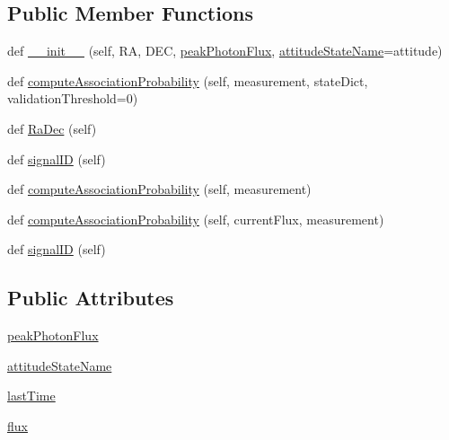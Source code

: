 \subsection*{Public Member Functions}
\begin{DoxyCompactItemize}
\item 
def \hyperlink{classSignals_1_1StaticXRayPointSource_ae3efcdb0e8a8c7fe9e3984c1cb785196}{\+\_\+\+\_\+init\+\_\+\+\_\+} (self, RA, D\+EC, \hyperlink{classSignals_1_1StaticXRayPointSource_a7e16da6506ee1b83c9858dce9c7856ea}{peak\+Photon\+Flux}, \hyperlink{classSignals_1_1PointSource_a151f2600c3623d1ca49fb51feb8a1178}{attitude\+State\+Name}=\textquotesingle{}attitude\textquotesingle{})
\item 
def \hyperlink{classSignals_1_1StaticXRayPointSource_a0533a3647597c6ad91c238ab2b97a829}{compute\+Association\+Probability} (self, measurement, state\+Dict, validation\+Threshold=0)
\item 
def \hyperlink{classSignals_1_1PointSource_a5fbb36eda0901536d77eff9a3262ae9e}{Ra\+Dec} (self)
\item 
def \hyperlink{classSignals_1_1SignalSource_a85016cca8a7f1e188d314ced50577d05}{signal\+ID} (self)
\item 
def \hyperlink{classSignals_1_1StaticPoissonSource_a61351ebf4f75f28e227cfee7ca7e5d64}{compute\+Association\+Probability} (self, measurement)
\item 
def \hyperlink{classSignals_1_1PoissonSource_a8e7a6023e7ee53ed0b5b81c7d0aa361c}{compute\+Association\+Probability} (self, current\+Flux, measurement)
\item 
def \hyperlink{classSignals_1_1SignalSource_a85016cca8a7f1e188d314ced50577d05}{signal\+ID} (self)
\end{DoxyCompactItemize}
\subsection*{Public Attributes}
\begin{DoxyCompactItemize}
\item 
\hyperlink{classSignals_1_1StaticXRayPointSource_a7e16da6506ee1b83c9858dce9c7856ea}{peak\+Photon\+Flux}
\item 
\hyperlink{classSignals_1_1PointSource_a151f2600c3623d1ca49fb51feb8a1178}{attitude\+State\+Name}
\item 
\hyperlink{classSignals_1_1PoissonSource_a66b0f3fb48cc130b6b07d7427092a522}{last\+Time}
\item 
\hyperlink{classSignals_1_1PoissonSource_a26e7bf25b1d9195bfded2a3ad6790bce}{flux}
\end{DoxyCompactItemize}
